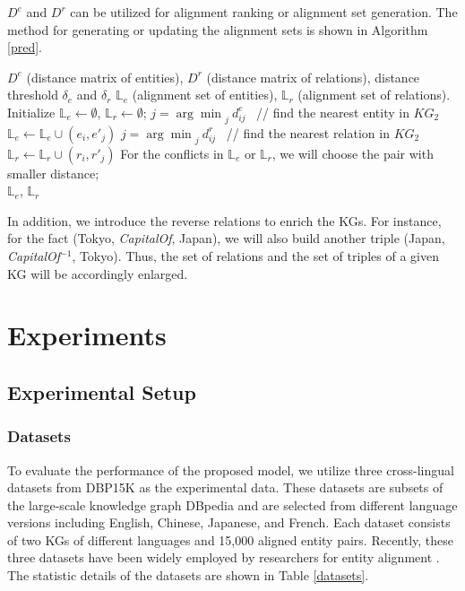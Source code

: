 \documentclass[letterpaper]{article} %
\begin{document}
$D^e$ and $D^r$ can be utilized for alignment ranking or alignment set generation. The method for generating or updating the alignment sets is shown in Algorithm \ref{pred}.

\begin{algorithm}[H]
\caption{Update Alignment Sets}
\label{pred}
\begin{algorithmic}[1]
\Require $D^e$ (distance matrix of entities), $D^r$ (distance matrix
of relations), distance threshold $\delta_e$ and $\delta_r$ \Ensure
$\mathbb{L}_e$ (alignment set of entities), $\mathbb{L}_r$
(alignment set of relations). \State Initialize
$\mathbb{L}_e \leftarrow \emptyset$, $\mathbb{L}_r \leftarrow
\emptyset$;  \State $j =
{\arg\min}_{j}\ {d^e_{ij}}$ \  // find the nearest entity in $KG_2$
 \State $\mathbb{L}_e \leftarrow
\mathbb{L}_e \cup (e_i,e'_j)$ \EndIf \EndFor {} \State $j = {\arg\min}_{j}\ {d^r_{ij}}$ \ // find
the nearest relation in $KG_2$  \State
$\mathbb{L}_r \leftarrow \mathbb{L}_r \cup (r_i,r'_j)$ \EndIf
\EndFor \State For the conflicts in $\mathbb{L}_e$ or $\mathbb{L}_r$,
we will choose the pair with smaller distance;
\\
\Return $\mathbb{L}_e$, $\mathbb{L}_r$
\end{algorithmic}
\end{algorithm}


In addition, we introduce the reverse relations to enrich the KGs.
For instance, for the fact (Tokyo, \emph{CapitalOf}, Japan), we will
also build another triple (Japan, \emph{CapitalOf}$^{-1}$, Tokyo).
Thus, the set of relations and the set of triples of a given KG will
be accordingly enlarged.



\section{Experiments}

\subsection{Experimental Setup}

\subsubsection{Datasets}

To evaluate the performance of the proposed model, we utilize three
cross-lingual datasets from DBP15K as the experimental data. These
datasets are subsets of the large-scale knowledge graph DBpedia
\cite{lehmann2015dbpedia} and are selected from different language
versions including English, Chinese, Japanese, and French. Each
dataset consists of two KGs of different languages and 15,000
aligned entity pairs. Recently, these three datasets have been
widely employed by researchers for entity alignment
\cite{wu2019relation, sun2020knowledge, wu2020neighborhood}. The
statistic details of the datasets are shown in Table \ref{datasets}.
\end{document}
